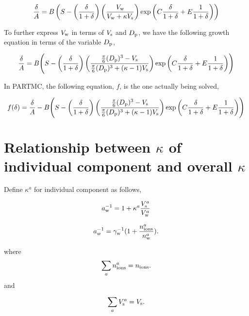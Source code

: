 \documentclass[12pt]{article}
\begin{document}
\begin{equation}\label{eqn:5.8}
\frac{\delta}{A}=B \left(S-\left(\frac{\delta}{1+\delta}\right) \left(\frac{V_{\rm w}}{V_{\rm w}+\kappa V_{\rm s}}\right)\exp{\left(C \frac{\delta}{1+\delta} +E \frac{1}{1+\delta}\right)}\right)
\end{equation}

To further express $V_{\rm w}$ in terms of $V_{\rm s}$ and $ D_{\rm p}$, we have the following growth equation in terms of the variable $D_{\rm p}$,

\begin{equation}\label{eqn:5.9}
\frac{\delta}{A}=B \Bigg(S-\left(\frac{\delta}{1+\delta}\right) \left(\frac{\frac{\pi}{6}(D_{\rm p})^{3}-V_{\rm s}} {\frac{\pi}{6}(D_{\rm p})^{3}+(\kappa-1)V_{\rm s}}\right)\exp{\left(C \frac{\delta}{1+\delta} +E \frac{1}{1+\delta}\right)} \Bigg)
\end{equation}

In PARTMC, the following equation, $f$, is the one actually being solved,

\begin{equation}\label{eqn:5.10}
f(\delta)=\frac{\delta}{A}-B \Bigg(S-\left(\frac{\delta}{1+\delta}\right) \left(\frac{\frac{\pi}{6}(D_{\rm p})^{3}-V_{\rm s}} {\frac{\pi}{6}(D_{\rm p})^{3}+(\kappa-1)V_{\rm s}}\right)\exp{\left(C \frac{\delta}{1+\delta} +E \frac{1}{1+\delta}\right)} \Bigg)
\end{equation}
\section{Relationship between $\kappa$ of individual component and overall $\kappa$}

Define $\kappa^{a}$ for individual component as follows, 

\begin{equation}\label{eqn:6.1}
a_{\rm w}^{-1}=1+\kappa^{a} \frac{V_{\rm s}^{a}}{V_{\rm w}^{a}} 
\end{equation}

\begin{equation}\label{eqn:6.2}
a_{w}^{-1}=\gamma_{\rm w}^{-1} (1+\frac{n_{\rm ions}^{a}}{n_{\rm w}^{a}}).
\end{equation}

where
\begin{equation}\label{eqn:6.3}
\sum_{a} n_{\rm ions}^{a}=n_{\rm ions}.
\end{equation}
 and 
 
\begin{equation}\label{eqn:6.4}
\sum_{a} V_{\rm s}^{a}=V_{\rm s}.
\end{equation}
\end{document}
